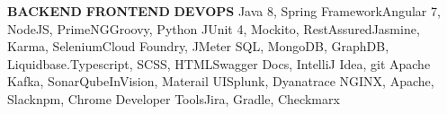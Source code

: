 


\begin{cvskills}


\cvskill
{\textbf{BACKEND}} {\textbf{FRONTEND}} {\textbf{DEVOPS}}
\cvskill
{Java 8, Spring Framework}{Angular 7, NodeJS, PrimeNG}{Groovy, Python}
\cvskill
{JUnit 4, Mockito, RestAssured}{Jasmine, Karma, Selenium}{Cloud Foundry, JMeter}
\cvskill
{SQL, MongoDB, GraphDB, Liquidbase.}{Typescript, SCSS, HTML}{Swagger Docs, IntelliJ Idea, git}
\cvskill
{Apache Kafka, SonarQube}{InVision, Materail UI}{Splunk, Dyanatrace}
\cvskill
{NGINX, Apache, Slack}{npm,  Chrome Developer Tools}{Jira, Gradle, Checkmarx}
\end{cvskills}